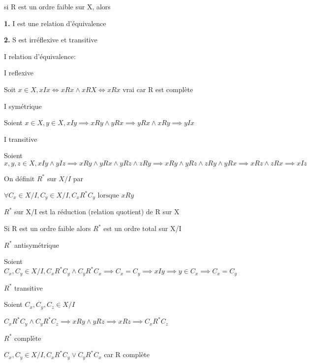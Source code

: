 \documentclass[a4paper, 12pt]{article}
\begin{document}
\begin{proposition}
    si R est un ordre faible sur X, alors

    \item \textbf{1.} I est une relation d'équivalence
    \item \textbf{2.} S est irréflexive et transitive
\end{proposition}

\begin{demonstration}
    I relation d'équivalence:

    \item I reflexive
    
    Soit $x \in X, xIx \iff xRx \land xRX \iff xRx$ vrai car R est complète

    \item I symétrique
    
    Soient $x \in X, y \in X, xIy \implies xRy \land yRx \implies yRx \land xRy \implies yIx$

    \item I transitive
    
    Soient $x, y, z \in X, xIy \land yIz \implies xRy \land yRx \land yRz \land zRy \implies xRy \land yRz \land zRy \land yRx \implies xRz \land zRx \implies xIz$
\end{demonstration}

On définit $R^*$ sur $X/I$ par 

$\forall C_x \in X/I, C_y \in X/I, C_xR^*C_y \text{ lorsque } xRy$

$R^*$ sur X/I est la réduction (relation quotient) de R sur X

\begin{proposition}
    Si R est un ordre faible alors $R^*$ est un ordre total sur X/I
\end{proposition}

\begin{demonstration}
    \item $R^*$ antisymétrique
    
    Soient $C_x, C_y \in X/I, C_x R^* C_y \land C_y R^* C_x \implies C_x = C_y \implies xIy \implies y \in C_x \implies C_x = C_y$

    \item $R^*$ transitive
    
    Soient $C_x, C_y, C_z \in X/I$

    $C_x R^* C_y \land C_y R^* C_z \implies xRy \land yRz \implies xRz \implies C_x R^* C_z$


    \item $R^*$ complète
    
    $C_x, C_y \in X/I, C_xR^*C_y \lor C_yR^*C_x$
    car R complète
\end{demonstration}
\end{document}
